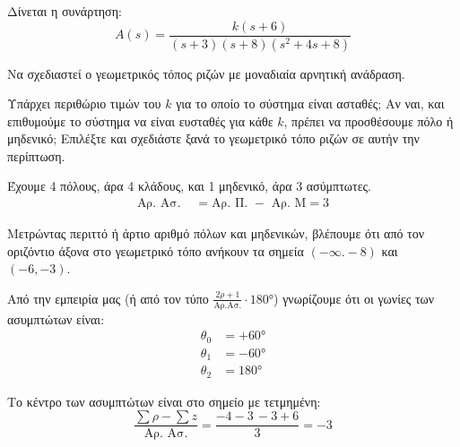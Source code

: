 \documentclass[11pt,a4paper,notitlepage,fleqn]{article}
\begin{document}
\begin{exercise}
Δίνεται η συνάρτηση:
\[
A(s) = \frac{k(s+6)}{(s+3)(s+8)(s^2+4s+8)}
\]

Να σχεδιαστεί ο γεωμετρικός τόπος ριζών με μοναδιαία αρνητική ανάδραση.

Υπάρχει περιθώριο τιμών του \( k \) για το οποίο το σύστημα είναι ασταθές; Αν ναι, και επιθυμούμε το σύστημα να είναι ευσταθές για κάθε \( k \), πρέπει να προσθέσουμε πόλο ή
μηδενικό; Επιλέξτε και σχεδιάστε ξανά το γεωμετρικό τόπο ριζών σε αυτήν την περίπτωση.

\tcblower

Έχουμε 4 πόλους, άρα 4 κλάδους, και 1 μηδενικό, άρα 3 ασύμπτωτες.
\begin{align*}
	\text{Αρ. Ασ. } &=\text{Αρ. Π. } - \text{ Αρ. Μ} = 3
\end{align*}

Μετρώντας περιττό ή άρτιο αριθμό πόλων και μηδενικών, βλέπουμε ότι από τον οριζόντιο άξονα
στο γεωμετρικό τόπο ανήκουν τα σημεία \( (-\infty.-8) \) και \( (-6,-3) \).

Από την εμπειρία μας (ή από τον τύπο \( \frac{2ρ+1}{\text{Αρ.Ασ.}}\cdot\ang{180} \)) γνωρίζουμε ότι οι γωνίες των ασυμπτώτων είναι:
\begin{align*}
	\theta_0 &= +\ang{60}\\
	\theta_1 &= -\ang{60}\\
	\theta_2 &= \ang{180}
\end{align*}

Το κέντρο των ασυμπτώτων είναι στο σημείο με τετμημένη:
\[
\frac{\sum ρ - \sum z}{\text{Αρ. Ασ.}}
= \frac{-4-3\,-3+6}{3} = -3
\]

\end{exercise}
\end{document}
